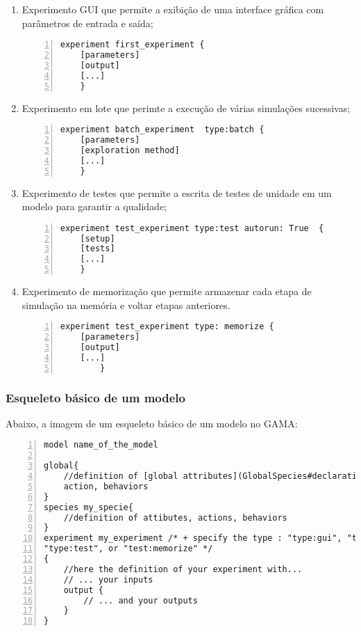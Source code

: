 \begin{enumerate}
\item Experimento GUI que permite a exibição de uma interface gráfica com parâmetros de entrada e saída;
		
\begin{lstlisting}[numbers=left, caption={Código}]
    experiment first_experiment {
	[parameters]
	[output]
	[...]
    }
\end{lstlisting}
		

\item Experimento em lote que perimte a execução de várias simulações sucessivas;

\begin{lstlisting}[numbers=left, caption={Código}]
    experiment batch_experiment  type:batch {
	[parameters]
	[exploration method]
	[...]
    }
\end{lstlisting}

\item Experimento de testes que permite a escrita de testes de unidade em um modelo para garantir a qualidade;

\begin{lstlisting}[numbers=left, caption={Código}]
    experiment test_experiment type:test autorun: True  {
	[setup]
	[tests]
	[...]
    }
\end{lstlisting}

\item Experimento de memorização que permite armazenar cada etapa de simulação na memória e voltar etapas anteriores.

\begin{lstlisting}[numbers=left, caption={Código}]
    experiment test_experiment type: memorize {
	[parameters]
	[output]
	[...]
        }
\end{lstlisting}
\end{enumerate}

\subsubsection{Esqueleto básico de um modelo}

Abaixo, a imagem de um esqueleto básico de um modelo no GAMA:

\begin{lstlisting}[numbers=left, caption={Código}]
model name_of_the_model

global{
	//definition of [global attributes](GlobalSpecies#declaration), 
	action,	behaviors
}
species my_specie{
	//definition of attibutes, actions, behaviors
}
experiment my_experiment /* + specify the type : "type:gui", "type:batch",
"type:test", or "test:memorize" */
{
	//here the definition of your experiment with...
	// ... your inputs
	output {
		// ... and your outputs
	}
}
\end{lstlisting}


